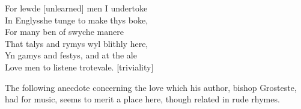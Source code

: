 \settowidth{\versewidth}{Hys Harper’s chaumbre was fast ther}
\begin{dcverse}For lewde [unlearned] men I undertoke\\
In Englysshe tunge to make thys boke,\\
For many ben of swyche manere\\

That talys and rymys wyl blithly here,\\
Yn gamys and festys, and at the ale\\
Love men to listene trotevale. [triviality]
\end{dcverse}


The following anecdote concerning the love which his author, bishop
Gros\-teste, had for music, seems to merit a place here, though related in rude
rhymes.


\settowidth{\versewidth}{Hys Harper’s chaumbre was fast ther}

